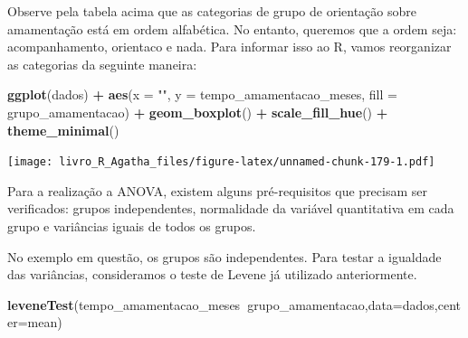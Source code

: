 \documentclass[
]{book}
\newenvironment{Shaded}{\begin{snugshade}}{\end{snugshade}}
\newcommand{\DataTypeTok}[1]{\textcolor[rgb]{0.13,0.29,0.53}{#1}}
\newcommand{\KeywordTok}[1]{\textcolor[rgb]{0.13,0.29,0.53}{\textbf{#1}}}
\newcommand{\NormalTok}[1]{#1}
\newcommand{\OperatorTok}[1]{\textcolor[rgb]{0.81,0.36,0.00}{\textbf{#1}}}
\newcommand{\StringTok}[1]{\textcolor[rgb]{0.31,0.60,0.02}{#1}}
\begin{document}
Observe pela tabela acima que as categorias de grupo de orientação sobre amamentação está em ordem alfabética. No entanto, queremos que a ordem seja: acompanhamento, orientaco e nada. Para informar isso ao R, vamos reorganizar as categorias da seguinte maneira:

\begin{Shaded}
\end{Shaded}

\begin{Shaded}
\begin{Highlighting}[]
\KeywordTok{ggplot}\NormalTok{(dados) }\OperatorTok{+}
\StringTok{ }\KeywordTok{aes}\NormalTok{(}\DataTypeTok{x =} \StringTok{""}\NormalTok{, }\DataTypeTok{y =}\NormalTok{ tempo_amamentacao_meses, }\DataTypeTok{fill =}\NormalTok{ grupo_amamentacao) }\OperatorTok{+}
\StringTok{ }\KeywordTok{geom_boxplot}\NormalTok{() }\OperatorTok{+}
\StringTok{ }\KeywordTok{scale_fill_hue}\NormalTok{() }\OperatorTok{+}
\StringTok{ }\KeywordTok{theme_minimal}\NormalTok{()}
\end{Highlighting}
\end{Shaded}

\texttt{[image: livro\_R\_Agatha\_files/figure-latex/unnamed-chunk-179-1.pdf]}

Para a realização a ANOVA, existem alguns pré-requisitos que precisam ser verificados: grupos independentes, normalidade da variável quantitativa em cada grupo e variâncias iguais de todos os grupos.

No exemplo em questão, os grupos são independentes. Para testar a igualdade das variâncias, consideramos o teste de Levene já utilizado anteriormente.

\begin{Shaded}
\begin{Highlighting}[]
\KeywordTok{leveneTest}\NormalTok{(tempo_amamentacao_meses}\OperatorTok{~}\NormalTok{grupo_amamentacao,}\DataTypeTok{data=}\NormalTok{dados,}\DataTypeTok{center=}\NormalTok{mean) }
\end{Highlighting}
\end{Shaded}
\end{document}
